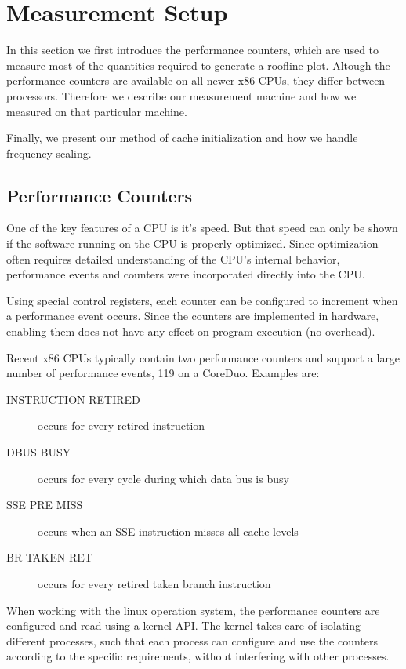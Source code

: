 \documentclass[a4paper,12pt]{article}
\begin{document}
\section{Measurement Setup}
In this section we first introduce the performance counters, which are
used to measure most of the quantities required to generate a roofline
plot. Altough the performance counters are available on all newer x86 CPUs,
they differ between processors. Therefore we describe our measurement
machine and how we measured on that particular machine.

Finally, we present our method of cache initialization and how we handle
frequency scaling.
 
\subsection{Performance Counters}
One of the key features of a CPU is it's speed. But that speed can only be
shown if the software running on the CPU is properly optimized. Since
optimization often requires detailed understanding of the CPU's internal
behavior, performance events and counters were incorporated directly into the
CPU. 

Using special control registers, each counter can be configured to increment
when a performance event occurs. Since the counters are implemented in hardware,
enabling them does not have any effect on program execution (no overhead). 

Recent x86 CPUs typically contain two performance counters and support a large
number of performance events, 119 on a CoreDuo. Examples are:
\begin{description}
  \item[INSTRUCTION RETIRED] occurs for every retired instruction
  \item[DBUS BUSY] occurs for every cycle during which data bus is busy
  \item[SSE PRE MISS] occurs when an SSE instruction misses all cache levels
  \item[BR TAKEN RET] occurs for every retired taken branch instruction 
\end{description}

When working with the linux operation system, the performance counters are
configured and read using a kernel API. The kernel takes care of isolating
different processes, such that each process can configure and use the counters
according to the specific requirements, without interfering with other processes.
\end{document}
